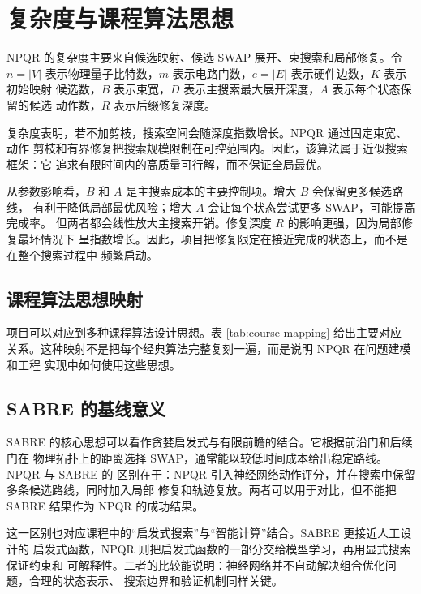 \section{复杂度与课程算法思想}

NPQR 的复杂度主要来自候选映射、候选 SWAP 展开、束搜索和局部修复。令 $n=|V|$
表示物理量子比特数，$m$ 表示电路门数，$e=|E|$ 表示硬件边数，$K$ 表示初始映射
候选数，$B$ 表示束宽，$D$ 表示主搜索最大展开深度，$A$ 表示每个状态保留的候选
动作数，$R$ 表示后缀修复深度。



复杂度表明，若不加剪枝，搜索空间会随深度指数增长。NPQR 通过固定束宽、动作
剪枝和有界修复把搜索规模限制在可控范围内。因此，该算法属于近似搜索框架：它
追求有限时间内的高质量可行解，而不保证全局最优。

从参数影响看，$B$ 和 $A$ 是主搜索成本的主要控制项。增大 $B$ 会保留更多候选路线，
有利于降低局部最优风险；增大 $A$ 会让每个状态尝试更多 SWAP，可能提高完成率。
但两者都会线性放大主搜索开销。修复深度 $R$ 的影响更强，因为局部修复最坏情况下
呈指数增长。因此，项目把修复限定在接近完成的状态上，而不是在整个搜索过程中
频繁启动。

\subsection{课程算法思想映射}

项目可以对应到多种课程算法设计思想。表 \ref{tab:course-mapping} 给出主要对应
关系。这种映射不是把每个经典算法完整复刻一遍，而是说明 NPQR 在问题建模和工程
实现中如何使用这些思想。



\subsection{SABRE 的基线意义}

SABRE 的核心思想可以看作贪婪启发式与有限前瞻的结合。它根据前沿门和后续门在
物理拓扑上的距离选择 SWAP，通常能以较低时间成本给出稳定路线。NPQR 与 SABRE 的
区别在于：NPQR 引入神经网络动作评分，并在搜索中保留多条候选路线，同时加入局部
修复和轨迹复放。两者可以用于对比，但不能把 SABRE 结果作为 NPQR 的成功结果。

这一区别也对应课程中的“启发式搜索”与“智能计算”结合。SABRE 更接近人工设计的
启发式函数，NPQR 则把启发式函数的一部分交给模型学习，再用显式搜索保证约束和
可解释性。二者的比较能说明：神经网络并不自动解决组合优化问题，合理的状态表示、
搜索边界和验证机制同样关键。
